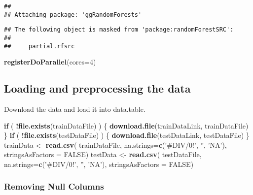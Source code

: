 \documentclass[]{article}
\newenvironment{Shaded}{\begin{snugshade}}{\end{snugshade}}
\newcommand{\KeywordTok}[1]{\textcolor[rgb]{0.13,0.29,0.53}{\textbf{#1}}}
\newcommand{\DataTypeTok}[1]{\textcolor[rgb]{0.13,0.29,0.53}{#1}}
\newcommand{\DecValTok}[1]{\textcolor[rgb]{0.00,0.00,0.81}{#1}}
\newcommand{\StringTok}[1]{\textcolor[rgb]{0.31,0.60,0.02}{#1}}
\newcommand{\OtherTok}[1]{\textcolor[rgb]{0.56,0.35,0.01}{#1}}
\newcommand{\ControlFlowTok}[1]{\textcolor[rgb]{0.13,0.29,0.53}{\textbf{#1}}}
\newcommand{\OperatorTok}[1]{\textcolor[rgb]{0.81,0.36,0.00}{\textbf{#1}}}
\newcommand{\NormalTok}[1]{#1}
\begin{document}
\begin{verbatim}
## 
## Attaching package: 'ggRandomForests'
\end{verbatim}

\begin{verbatim}
## The following object is masked from 'package:randomForestSRC':
## 
##     partial.rfsrc
\end{verbatim}

\begin{Shaded}
\begin{Highlighting}[]
\KeywordTok{registerDoParallel}\NormalTok{(}\DataTypeTok{cores=}\DecValTok{4}\NormalTok{)}
\end{Highlighting}
\end{Shaded}

\subsection{Loading and preprocessing the
data}\label{loading-and-preprocessing-the-data}

Download the data and load it into data.table.

\begin{Shaded}
\begin{Highlighting}[]
\ControlFlowTok{if}\NormalTok{ ( }\OperatorTok{!}\KeywordTok{file.exists}\NormalTok{(trainDataFile) ) \{}
  \KeywordTok{download.file}\NormalTok{(trainDataLink, trainDataFile)}
\NormalTok{\}}
\ControlFlowTok{if}\NormalTok{ ( }\OperatorTok{!}\KeywordTok{file.exists}\NormalTok{(testDataFile) ) \{}
  \KeywordTok{download.file}\NormalTok{(testDataLink, testDataFile)}
\NormalTok{\}}
\NormalTok{trainData <-}\StringTok{ }\KeywordTok{read.csv}\NormalTok{( trainDataFile, }\DataTypeTok{na.strings=}\KeywordTok{c}\NormalTok{(}\StringTok{'#DIV/0!'}\NormalTok{, }\StringTok{''}\NormalTok{, }\StringTok{'NA'}\NormalTok{), }\DataTypeTok{stringsAsFactors =} \OtherTok{FALSE}\NormalTok{)}
\NormalTok{testData  <-}\StringTok{ }\KeywordTok{read.csv}\NormalTok{( testDataFile,  }\DataTypeTok{na.strings=}\KeywordTok{c}\NormalTok{(}\StringTok{'#DIV/0!'}\NormalTok{, }\StringTok{''}\NormalTok{, }\StringTok{'NA'}\NormalTok{), }\DataTypeTok{stringsAsFactors =} \OtherTok{FALSE}\NormalTok{)}
\end{Highlighting}
\end{Shaded}

\subsubsection{Removing Null Columns}\label{removing-null-columns}
\end{document}
